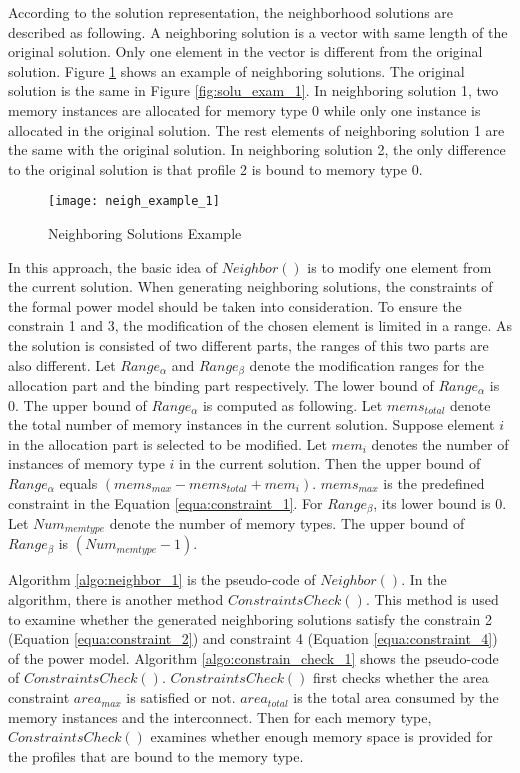 		According to the solution representation, the neighborhood solutions are described
		as following. 
		A neighboring solution is a vector with same length of the
		original solution. Only one element in the vector is different from the
		original solution.
		Figure \ref{fig:neigh_solu_exam_1} shows an example of neighboring solutions.
		The original solution is the same in Figure \ref{fig:solu_exam_1}.
		In neighboring solution 1, two memory instances are allocated for memory type 0
		while only one instance is allocated in the original solution.
		The rest elements of neighboring solution 1 are the same with the original solution.
		In neighboring solution 2, the only difference to the original solution is that
		profile 2 is bound to memory type 0.
		\begin{figure}[h]
			\begin{center}
				\texttt{[image: neigh\_example\_1]}
				\caption{Neighboring Solutions Example}
				\label{fig:neigh_solu_exam_1}
			\end{center}
		\end{figure}

		In this approach, the basic idea of $Neighbor()$ is to modify one element from the
		current solution. When generating neighboring solutions, the constraints of the formal power model should be taken into consideration.
		To ensure the constrain 1 and 3, the modification of the chosen element is limited in a
		range. As the solution is consisted of two different parts, the ranges of this two parts are also different.
		Let $Range_{\alpha}$ and $Range_{\beta}$ denote the modification ranges for the allocation part
		and the binding part respectively.
		The lower bound of $Range_{\alpha}$ is 0. The upper bound of $Range_{\alpha}$ is computed as following.
		Let $mems_{total}$ denote the total number of memory instances in the current solution.
		Suppose element $i$ in the allocation part is selected to be modified.
		Let $mem_{i}$ denotes the number of instances of memory type $i$ in the current solution.		
		Then the upper bound of $Range_{\alpha}$ equals $(mems_{max}-mems_{total}+mem_{i})$.
		$mems_{max}$ is the predefined constraint in the Equation \ref{equa:constraint_1}.
		For $Range_{\beta}$, its lower bound is 0.
		Let $Num_{memtype}$ denote the number of memory types.
		The upper bound of $Range_{\beta}$ is $(Num_{memtype}-1)$.
		
		Algorithm \ref{algo:neighbor_1} is the pseudo-code of $Neighbor()$.
		In the algorithm, there is another method $ConstraintsCheck()$.
		This method is used to examine whether the generated neighboring solutions satisfy the
		constrain 2 (Equation \ref{equa:constraint_2}) and constraint 4
		(Equation \ref{equa:constraint_4}) of the power model.
		Algorithm \ref{algo:constrain_check_1} shows the pseudo-code of $ConstraintsCheck()$.
		$ConstraintsCheck()$ first checks whether the area constraint $area_{max}$ is satisfied
		or not.
		$area_{total}$ is the total area consumed by the memory instances and the interconnect.
		Then for each memory type, $ConstraintsCheck()$ examines whether enough memory space is
		provided for the profiles that are bound to the memory type.
		
		

